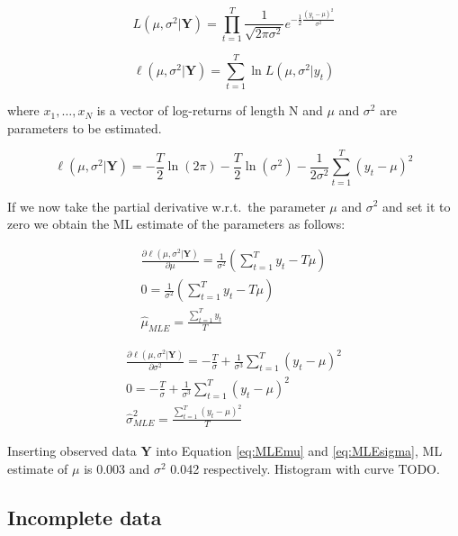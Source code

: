 \begin{equation}
    L(\mu,\sigma^2|\textbf{Y}) = \prod_{t=1}^{T} \frac{1}{\sqrt{2\pi \sigma^2}} e^{-\frac{1}{2} \frac{{(y_t-\mu)}^2}{\sigma^2}}
\end{equation}

\begin{equation}
    \ell(\mu,\sigma^2|\textbf{Y}) = \sum_{t=1}^{T} \ln L(\mu,\sigma^2|y_t) 
\end{equation}

where $x_1,\ldots,x_N$ is a vector of log-returns of length N and $\mu$ and $\sigma^2$ are parameters to be estimated. 

\begin{equation}
    \ell(\mu,\sigma^2|\textbf{Y}) = -\frac{T}{2} \ln(2 \pi) - \frac{T}{2} \ln(\sigma^2) - \frac{1}{2 \sigma^2} \sum_{t=1}^{T} {(y_t - \mu)}^2
\end{equation}

If we now take the partial derivative w.r.t.\ the parameter $\mu$ and $\sigma^2$ and set it to zero we obtain the ML estimate of the 
parameters as follows:

\begin{gather} 
\frac{\partial \ell(\mu,\sigma^2|\textbf{Y})}{\partial \mu}  = \frac{1}{\sigma^2} (\sum_{t=1}^{T} y_t - T\mu) \nonumber \\
0 = \frac{1}{\sigma^2} (\sum_{t=1}^{T} y_t - T\mu) \nonumber\\
\hat{\mu}_{MLE} = \frac{\sum_{t=1}^{T} y_t}{T} \label{eq:MLEmu}
\end{gather}

\begin{gather} 
\frac{\partial \ell(\mu,\sigma^2|\textbf{Y})}{\partial \sigma^2}  = -\frac{T}{\sigma}+ \frac{1}{\sigma^3} \sum_{t=1}^{T} {(y_t - \mu)}^2 \nonumber\\
0 = -\frac{T}{\sigma}+ \frac{1}{\sigma^3} \sum_{t=1}^{T} {(y_t - \mu)}^2 \nonumber\\
\hat{\sigma}_{MLE}^2 = \frac{\sum_{t=1}^{T} {(y_t - \mu)}^2}{T} \label{eq:MLEsigma} 
\end{gather}

Inserting observed data $\textbf{Y}$ into Equation \ref{eq:MLEmu} and \ref{eq:MLEsigma}, ML estimate of $\mu$ is 0.003 and $\sigma^2$ 
0.042 respectively. Histogram with curve TODO.

\subsection*{Incomplete data}

